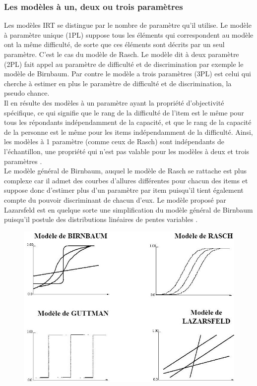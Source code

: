 \subsubsection{Les modèles à un, deux ou trois paramètres}
Les modèles IRT se distingue par le nombre de paramètre qu’il utilise. Le modèle à paramètre unique (1PL) suppose tous les éléments qui correspondent au modèle ont la même difficulté, de sorte que ces éléments sont décrits par un seul paramètre. C’est le cas du modèle de Rasch. Le modèle dit à deux paramètre (2PL) fait appel au paramètre de difficulté et de discrimination par exemple le modèle de Birnbaum. Par contre le modèle a trois paramètres (3PL) est celui qui cherche à estimer en plus le paramètre de difficulté et de discrimination, la pseudo chance. \\
Il en résulte des modèles à un paramètre ayant la propriété d'objectivité spécifique, ce qui signifie que le rang de la difficulté de l'item est le même pour tous les répondants indépendamment de la capacité, et que le rang de la capacité de la personne est le même pour les items indépendamment de la difficulté. Ainsi, les modèles à 1 paramètre (comme ceux de Rasch) sont indépendants de l'échantillon, une propriété qui n'est pas valable pour les modèles à deux et trois paramètres \cite{fisher1922mathematical}. \\
Le modèle général de Birnbaum, auquel le modèle de Rasch se rattache est plus complexe car il admet des courbes d’allures différentes pour chacun des items et suppose donc d’estimer plus d’un paramètre par item puisqu’il tient également compte du pouvoir discriminant de chacun d’eux. Le modèle proposé par Lazarsfeld est en quelque sorte une simplification du modèle général de Birnbaum puisqu’il postule des distributions linéaires de pentes variables \cite{yvonnick_2019}. \\

\begin{figure}[H]
	\begin{center}
		\includegraphics[width=\textwidth]{images/chapitre5/irt_models.jpg}
	\end{center}
	\caption{}
	\label{irt_models}
\end{figure}
